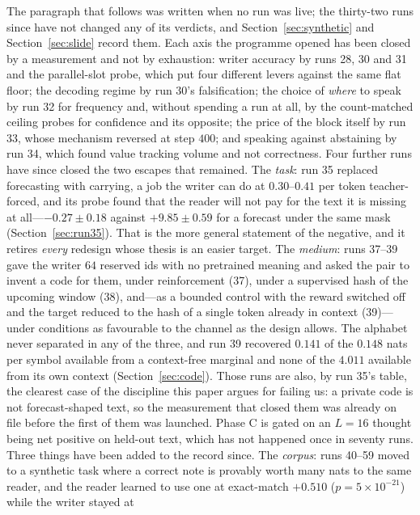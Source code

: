 \documentclass{article} %
\begin{document}
The paragraph that follows was written when no run was live; the thirty-two runs since have not changed any of its verdicts, and Section~\ref{sec:synthetic} and Section~\ref{sec:slide} record them. Each axis the programme opened has been closed by a measurement and not by exhaustion: writer accuracy by runs 28, 30 and 31 and the parallel-slot probe, which put four different levers against the same flat floor; the decoding regime by run 30's falsification; the choice of \emph{where} to speak by run 32 for frequency and, without spending a run at all, by the count-matched ceiling probes for confidence and its opposite; the price of the block itself by run 33, whose mechanism reversed at step $400$; and speaking against abstaining by run 34, which found value tracking volume and not correctness. Four further runs have since closed the two escapes that remained. The \emph{task}: run 35 replaced forecasting with carrying, a job the writer can do at $0.30$--$0.41$ per token teacher-forced, and its probe found that the reader will not pay for the text it is missing at all---$-0.27 \pm 0.18$ against $+9.85 \pm 0.59$ for a forecast under the same mask (Section~\ref{sec:run35}). That is the more general statement of the negative, and it retires \emph{every} redesign whose thesis is an easier target. The \emph{medium}: runs 37--39 gave the writer $64$ reserved ids with no pretrained meaning and asked the pair to invent a code for them, under reinforcement (37), under a supervised hash of the upcoming window (38), and---as a bounded control with the reward switched off and the target reduced to the hash of a single token already in context (39)---under conditions as favourable to the channel as the design allows. The alphabet never separated in any of the three, and run 39 recovered $0.141$ of the $0.148$ nats per symbol available from a context-free marginal and none of the $4.011$ available from its own context (Section~\ref{sec:code}). Those runs are also, by run 35's table, the clearest case of the discipline this paper argues for failing us: a private code is not forecast-shaped text, so the measurement that closed them was already on file before the first of them was launched. Phase C is gated on an $L{=}16$ thought being net positive on held-out text, which has not happened
once in seventy runs. Three things have been added to the record since. The \emph{corpus}: runs 40--59
moved to a synthetic task where a correct note is provably worth many nats to the same reader, and the
reader learned to use one at exact-match $+0.510$ ($p = 5\times10^{-21}$) while the writer stayed at
\end{document}
